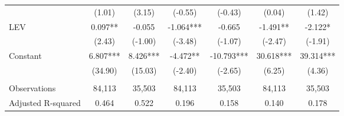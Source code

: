 \begin{table}[htbp]
\begin{tabular}{lcccccc}
      & (1.01) & \multicolumn{1}{c}{(3.15)} & (-0.55) & \multicolumn{1}{c}{(-0.43)} & (0.04) & \multicolumn{1}{c}{(1.42)} \\
    LEV & 0.097** & \multicolumn{1}{c}{-0.055} & -1.064*** & \multicolumn{1}{c}{-0.665} & -1.491** & \multicolumn{1}{c}{-2.122*} \\
      & (2.43) & \multicolumn{1}{c}{(-1.00)} & (-3.48) & \multicolumn{1}{c}{(-1.07)} & (-2.47) & \multicolumn{1}{c}{(-1.91)} \\
    Constant & 6.807*** & \multicolumn{1}{c}{8.426***} & -4.472** & \multicolumn{1}{c}{-10.793***} & 30.618*** & \multicolumn{1}{c}{39.314***} \\
      & (34.90) & \multicolumn{1}{c}{(15.03)} & (-2.40) & \multicolumn{1}{c}{(-2.65)} & (6.25) & \multicolumn{1}{c}{(4.36)} \\
    &&&&&&\\
    Observations & 84,113 & \multicolumn{1}{c}{35,503} & 84,113 & \multicolumn{1}{c}{35,503} & 84,113 & \multicolumn{1}{c}{35,503} \\
    Adjusted R-squared & 0.464 & \multicolumn{1}{c}{0.522} & 0.196 & \multicolumn{1}{c}{0.158} & 0.140 & \multicolumn{1}{c}{0.178} \\
    \bottomrule
    \bottomrule
    \end{tabular}%
\end{table}%
